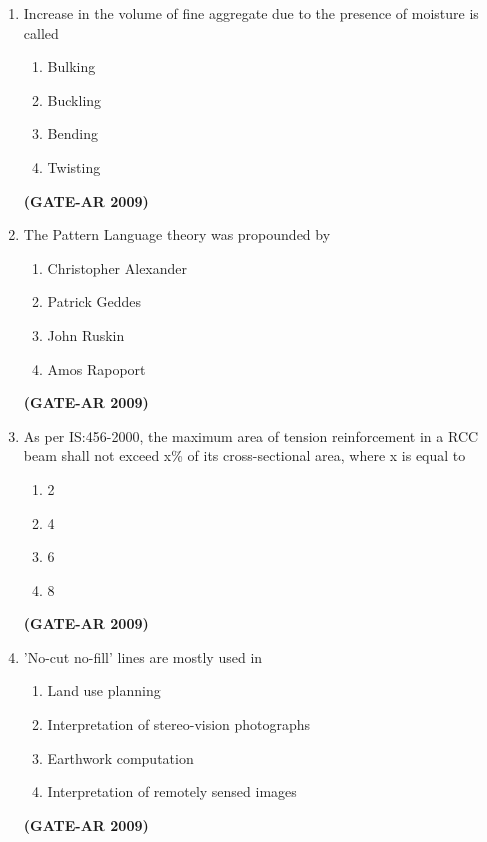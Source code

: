 \documentclass[a4paper,10pt]{article}
\begin{document}
\begin{enumerate}
    \item Increase in the volume of fine aggregate due to the presence of moisture is called 
    \begin{multicols}{4}
	\begin{enumerate}
        \item Bulking
        \item Buckling
        \item Bending
        \item Twisting
    \end{enumerate}
	\end{multicols}
    \hfill \textbf{(GATE-AR 2009)}
    
    \item The Pattern Language theory was propounded by 
    \begin{multicols}{2}
	\begin{enumerate}
        \item Christopher Alexander
        \item Patrick Geddes
        \item John Ruskin
        \item Amos Rapoport
    \end{enumerate}
	\end{multicols}
    \hfill \textbf{(GATE-AR 2009)}
    
    \item As per IS:456-2000, the maximum area of tension reinforcement in a RCC beam shall not exceed x\% of its cross-sectional area, where x is equal to 
    \begin{multicols}{4}
	\begin{enumerate}
        \item 2
        \item 4
        \item 6
        \item 8
    \end{enumerate}
	\end{multicols}
    \hfill \textbf{(GATE-AR 2009)}
    
    \item 'No-cut no-fill' lines are mostly used in 
    \begin{multicols}{2}
	\begin{enumerate}
        \item Land use planning
        \item Interpretation of stereo-vision photographs
        \item Earthwork computation
        \item Interpretation of remotely sensed images
    \end{enumerate}
	\end{multicols}
    \hfill \textbf{(GATE-AR 2009)}
    

\end{enumerate}
\end{document}
